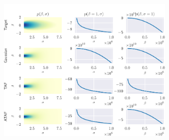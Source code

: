 \begin{subframe}
    \begin{figure}[htbp]
  \centering
  \vspace{-0.2cm}
  \includegraphics[width=0.75\textwidth]{Figures/ftvi/blr_aniso.pdf}
  \vspace{-0.3cm}
  \label{fig:blr-anisotropic}
\end{figure}
\end{subframe}



